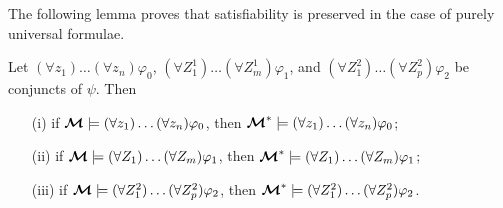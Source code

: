 \documentclass{fundam}
\newcommand{\model}{\ensuremath{\mbox{\boldmath $\mathcal{M}$}}\xspace}
\begin{document}
The following lemma proves that satisfiability is preserved in the case of purely universal formulae.
\begin{lemma}\label{quantifiedform}
Let $(\forall z_1) \ldots (\forall z_n) \varphi_0$, $(\forall Z_1^1)
\ldots (\forall Z_m^1) \varphi_1$, and $(\forall Z_1^2) \ldots
(\forall Z_p^2) \varphi_2$ be conjuncts of $\psi$.  Then
\begin{itemize}
\item [(i)] if $\model\models (\forall z_1) \ldots (\forall z_n)
\varphi_0$, then $\model^*\models (\forall z_1) \ldots (\forall z_n)
\varphi_0$;

\item [(ii)] if $\model\models (\forall Z_1) \ldots (\forall Z_m)
\varphi_1$, then $\model^*\models (\forall Z_1) \ldots (\forall Z_m)
\varphi_1$;
\item [(iii)] if $\model\models (\forall Z_1^2) \ldots (\forall Z_p^2)
\varphi_2$, then $\model^*\models (\forall Z_1^2) \ldots (\forall Z_p^2)
\varphi_2$.
\end{itemize}
\end{lemma}
\end{document}
